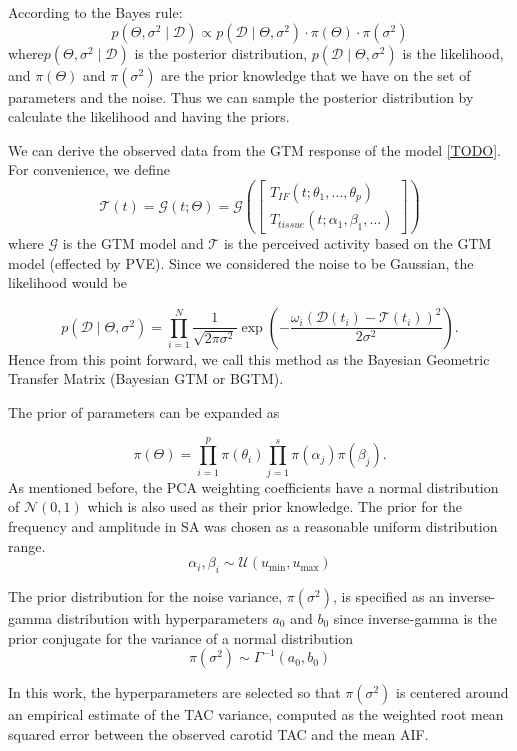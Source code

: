 According to the Bayes rule:
\[
	p(\Theta,\sigma^2 \mid \mathcal{D}) \propto p(\mathcal{D} \mid \Theta,\sigma^2) \cdot \pi( \Theta ) \cdot \pi( \sigma^2)
\]
where\(p(\Theta,\sigma^2 \mid \mathcal{D})\) is the posterior distribution, \(p(\mathcal{D} \mid \Theta,\sigma^2)\) is the likelihood, and $\pi(\Theta)$ and $\pi(\sigma^2)$ are the prior knowledge that we have on the set of parameters and the noise. Thus we can sample the posterior distribution by calculate the likelihood and having the priors.  


We can derive the observed data from the GTM response of the model \ref{TODO}.
For convenience, we define
\[
	\mathcal{T}(t) = \mathcal{G}(t;\Theta) =
	\mathcal{G}\left(
	\begin{bmatrix}
			T_{IF}(t;\theta_{1}, \dots, \theta_{p}) \\
			T_{tissue}(t;\alpha_{1}, \beta_{1}, \dots)
		\end{bmatrix}\right)
\]
where $\mathcal{G}$ is the GTM model and $\mathcal{T}$ is the perceived activity based on the GTM model (effected by PVE). Since we considered the noise to be Gaussian, the likelihood would be

\[
	p(\mathcal{D} \mid \Theta,\sigma^2) = \prod_{i=1}^N \frac{1}{\sqrt{2\pi \sigma^2}} \exp\left( -\frac{\omega_i(\mathcal{D}(t_i) - \mathcal{T}(t_i))^2}{2\sigma^2} \right).
\]
Hence from this point forward, we call this method as the Bayesian Geometric Transfer Matrix (Bayesian GTM or BGTM).

The prior of parameters can be expanded as

\[
	\pi(\Theta) = \prod_{i=1}^p \pi(\theta_i)\prod_{j=1}^s \pi(\alpha_j) \pi(\beta_j).  
\]
As mentioned before, the PCA weighting coefficients have a normal distribution of $\mathcal{N}(0,1)$ which is also used as their prior knowledge.
The prior for the frequency and amplitude in SA was chosen as a reasonable uniform distribution range.
\[
	\alpha_i,\beta_i \sim \mathcal{U}( u_{\text{min}} , u_{\text{max}} )
\]

The prior distribution for the noise variance, $\pi(\sigma^2)$, is specified as an inverse-gamma distribution with hyperparameters $a_0$ and $b_0$ since inverse-gamma is the prior conjugate for the variance of a normal distribution
\[
	\pi(\sigma^2) \sim \Gamma^{-1}(a_0,b_0)
\]

In this work, the hyperparameters are selected so that $\pi(\sigma^2)$ is centered around an empirical estimate of the TAC variance, computed as the weighted root mean squared error between the observed carotid TAC and the mean AIF.

